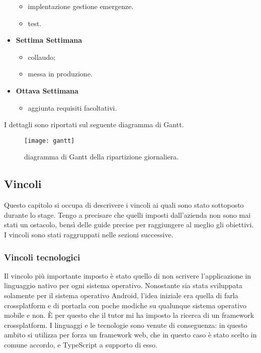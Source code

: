 \begin{itemize}
\begin{itemize}
				\item implentazione gestione emergenze.
				\item test.
		\end{itemize}
		\item \textbf{Settima Settimana}
		\begin{itemize}
				\item collaudo;
				\item messa in produzione.
		\end{itemize}
		\item \textbf{Ottava Settimana}
		\begin{itemize}
				\item aggiunta requisiti facoltativi.
		\end{itemize}
\end{itemize}

I dettagli sono riportati sul seguente \gls{diagramma di Gantt}.

\begin{figure}[h]
	\begin{center}
		\texttt{[image: gantt]}
		\caption{\gls{diagramma di Gantt} della ripartizione giornaliera.}
	\end{center}
\end{figure}

\subsection{Vincoli}

Questo capitolo si occupa di descrivere i vincoli ai quali sono stato sottoposto durante lo stage. Tengo a precisare che quelli imposti dall'azienda non sono mai stati un ostacolo, bensì delle guide precise per raggiungere al meglio gli obiettivi. I vincoli sono stati raggruppati nelle sezioni successive.

\subsubsection{Vincoli tecnologici}
Il vincolo più importante imposto è stato quello di non scrivere l'applicazione in linguaggio nativo per ogni sistema operativo. Nonostante sia stata sviluppata solamente per il sistema operativo Android, l'idea iniziale era quella di farla \gls{crossplatform} e di portarla con poche modiche su qualunque sistema operativo mobile e non. È per questo che il tutor mi ha imposto la ricerca di un framework crossplatform. I linguaggi e le tecnologie sono venute di conseguenza: in questo ambito si utilizza per forza un framework web, che in questo caso è stato scelto in comune accordo, e TypeScript a supporto di esso.

